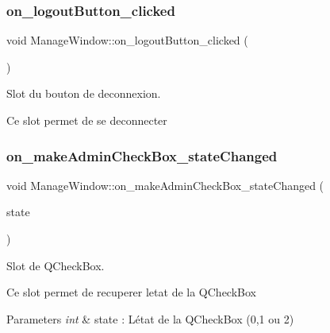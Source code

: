 \subsubsection{\texorpdfstring{on\+\_\+logout\+Button\+\_\+clicked}{on\_logoutButton\_clicked}}
{\footnotesize\ttfamily void Manage\+Window\+::on\+\_\+logout\+Button\+\_\+clicked (\begin{DoxyParamCaption}{ }\end{DoxyParamCaption})\hspace{0.3cm}{\ttfamily [slot]}}



Slot du bouton de deconnexion. 

Ce slot permet de se deconnecter \mbox{\label{classManageWindow_ab7d59fdc4c2c9a5e87a35bbd2dc347eb}} 
\subsubsection{\texorpdfstring{on\+\_\+make\+Admin\+Check\+Box\+\_\+state\+Changed}{on\_makeAdminCheckBox\_stateChanged}}
{\footnotesize\ttfamily void Manage\+Window\+::on\+\_\+make\+Admin\+Check\+Box\+\_\+state\+Changed (\begin{DoxyParamCaption}\item[{int}]{state }\end{DoxyParamCaption})\hspace{0.3cm}{\ttfamily [slot]}}



Slot de Q\+Check\+Box. 

Ce slot permet de recuperer l\textquotesingle{}etat de la Q\+Check\+Box 
\begin{DoxyParams}{Parameters}
{\em int} & state \+: L\textquotesingle{}état de la Q\+Check\+Box (0,1 ou 2) \\
\hline
\end{DoxyParams}
\mbox{\label{classManageWindow_a859f6ebcd55bb08d3013fd25fa902304}} 
